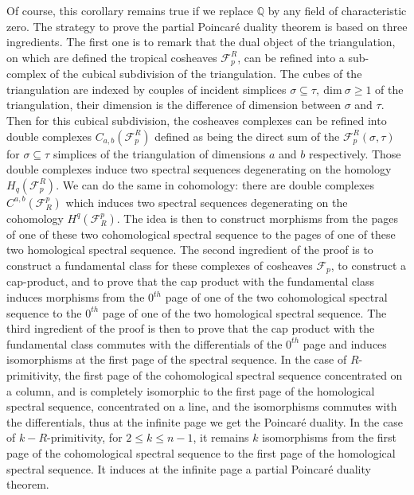 \documentclass{article}
\begin{document}
Of course, this corollary remains true if we replace $\mathbb{Q}$ by any field of characteristic zero. The strategy to prove the partial Poincaré duality theorem is based on three ingredients. The first one is to remark that the dual object of the triangulation, on which are defined the tropical cosheaves $\mathcal{F}_p^R$, can be refined into a sub-complex of the cubical subdivision of the triangulation. The cubes of the triangulation are indexed by couples of incident simplices $\sigma\subseteq \tau,~\mathrm{dim} ~\sigma\geq 1$ of the triangulation, their dimension is the difference of dimension between $\sigma$ and $\tau$. Then for this cubical subdivision, the cosheaves complexes can be refined into double complexes $C_{a,b}(\mathcal{F}_p^R)$ defined as being the direct sum of the $\mathcal{F}_p^
R(\sigma,\tau)$ for $\sigma\subseteq\tau$ simplices of the triangulation of dimensions $a$ and $b$ respectively. Those double complexes induce two spectral sequences degenerating on the homology $H_q(\mathcal{F}_p^R)$. We can do the same in cohomology: there are double complexes $C^{a,b}(\mathcal{F}^p_R)$ which induces two spectral sequences degenerating on the cohomology $H^q(\mathcal{F}^p_R)$. The idea is then to construct morphisms from the pages of one of these two cohomological spectral sequence to the pages of one of these two homological spectral sequence. The second ingredient of the proof is to construct a fundamental class for these complexes of cosheaves $\mathcal{F}_p$, to construct a cap-product, and to prove that the cap product with the fundamental class induces morphisms from the $0^{th}$ page of one of the two cohomological spectral sequence to the $0^{th}$ page of one of the two homological spectral sequence. The third ingredient of the proof is then to prove that the cap product with the fundamental class commutes with the differentials of the $0^{th}$ page and induces isomorphisms at the first page of the spectral sequence. In the case of $R$-primitivity, the first page of the cohomological spectral sequence concentrated on a column, and is completely isomorphic to the first page of the homological spectral sequence, concentrated on a line, and the isomorphisms commutes with the differentials, thus at the infinite page we get the Poincaré duality. In the case of $k-R$-primitivity, for $2\leq k\leq n-1$, it remains $k$ isomorphisms from the first page of the cohomological spectral sequence to the first page of the homological spectral sequence. It induces at the infinite page a partial Poincaré duality theorem.
\end{document}
